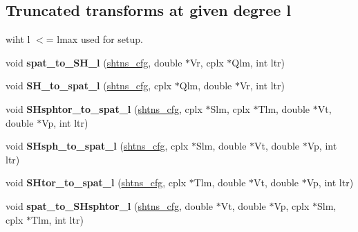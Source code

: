 \subsection*{Truncated transforms at given degree l}
\label{_amgrp9c729953e7f509873eb2a2b1b84dfbb8}%
wiht l $<$= lmax used for setup.\begin{DoxyCompactItemize}
\item 
\hypertarget{group__sht_gae3fc248f047193b63cf5b2fe9116c446}{}void {\bfseries spat\+\_\+to\+\_\+\+S\+H\+\_\+l} (\hyperlink{shtns_8h_ab7bd78e5cbeb4ed18782d018195fde00}{shtns\+\_\+cfg}, double $\ast$Vr, cplx $\ast$Qlm, int ltr)\label{group__sht_gae3fc248f047193b63cf5b2fe9116c446}

\item 
\hypertarget{group__sht_ga58a00ba24cc76f4af7f0ecff0d4ef80d}{}void {\bfseries S\+H\+\_\+to\+\_\+spat\+\_\+l} (\hyperlink{shtns_8h_ab7bd78e5cbeb4ed18782d018195fde00}{shtns\+\_\+cfg}, cplx $\ast$Qlm, double $\ast$Vr, int ltr)\label{group__sht_ga58a00ba24cc76f4af7f0ecff0d4ef80d}

\item 
\hypertarget{group__sht_ga231b717bf9f76f144ec103e97a7c7d40}{}void {\bfseries S\+Hsphtor\+\_\+to\+\_\+spat\+\_\+l} (\hyperlink{shtns_8h_ab7bd78e5cbeb4ed18782d018195fde00}{shtns\+\_\+cfg}, cplx $\ast$Slm, cplx $\ast$Tlm, double $\ast$Vt, double $\ast$Vp, int ltr)\label{group__sht_ga231b717bf9f76f144ec103e97a7c7d40}

\item 
\hypertarget{group__sht_ga0226c3383f94807d7a7afa9242fba111}{}void {\bfseries S\+Hsph\+\_\+to\+\_\+spat\+\_\+l} (\hyperlink{shtns_8h_ab7bd78e5cbeb4ed18782d018195fde00}{shtns\+\_\+cfg}, cplx $\ast$Slm, double $\ast$Vt, double $\ast$Vp, int ltr)\label{group__sht_ga0226c3383f94807d7a7afa9242fba111}

\item 
\hypertarget{group__sht_ga0391e57a8dadee0dadbc3ac4eec60910}{}void {\bfseries S\+Htor\+\_\+to\+\_\+spat\+\_\+l} (\hyperlink{shtns_8h_ab7bd78e5cbeb4ed18782d018195fde00}{shtns\+\_\+cfg}, cplx $\ast$Tlm, double $\ast$Vt, double $\ast$Vp, int ltr)\label{group__sht_ga0391e57a8dadee0dadbc3ac4eec60910}

\item 
\hypertarget{group__sht_ga1ea304108a74a114fdc607da8f6badb2}{}void {\bfseries spat\+\_\+to\+\_\+\+S\+Hsphtor\+\_\+l} (\hyperlink{shtns_8h_ab7bd78e5cbeb4ed18782d018195fde00}{shtns\+\_\+cfg}, double $\ast$Vt, double $\ast$Vp, cplx $\ast$Slm, cplx $\ast$Tlm, int ltr)\label{group__sht_ga1ea304108a74a114fdc607da8f6badb2}


\end{DoxyCompactItemize}
